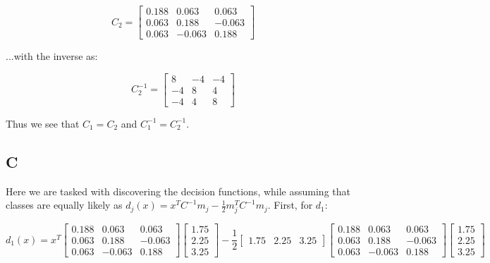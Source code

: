 \documentclass{article}
\begin{document}
\begin{equation}
    C_2 = \begin{bmatrix}
        0.188 & 0.063 & 0.063 \\
        0.063 & 0.188 & -0.063 \\
        0.063 & -0.063 & 0.188
    \end{bmatrix}
\end{equation}

\noindent ...with the inverse as:

\begin{equation}
    C_2^{-1} = \begin{bmatrix}
        8 & -4 & -4 \\
        -4 & 8 & 4 \\
        -4 & 4 & 8
    \end{bmatrix}
\end{equation}

\noindent Thus we see that $C_1=C_2$ and $C_1^{-1}=C_2^{-1}$.

\subsection*{C}

Here we are tasked with discovering the decision functions, while assuming that classes are equally likely as $d_j(x)=x^T C^{-1} m_j - \frac{1}{2} m_j^T C^{-1} m_j$. First, for $d_1$:

\begin{equation}
    d_1(x) = x^T \begin{bmatrix}
        0.188 & 0.063 & 0.063 \\
        0.063 & 0.188 & -0.063 \\
        0.063 & -0.063 & 0.188
    \end{bmatrix} \begin{bmatrix}
        1.75 \\ 2.25 \\ 3.25
    \end{bmatrix} -
    \frac{1}{2} \begin{bmatrix}
        1.75 & 2.25 & 3.25
    \end{bmatrix}
    \begin{bmatrix}
        0.188 & 0.063 & 0.063 \\
        0.063 & 0.188 & -0.063 \\
        0.063 & -0.063 & 0.188
    \end{bmatrix} \begin{bmatrix}
        1.75 \\ 2.25 \\ 3.25
    \end{bmatrix}
\end{equation}
\end{document}
